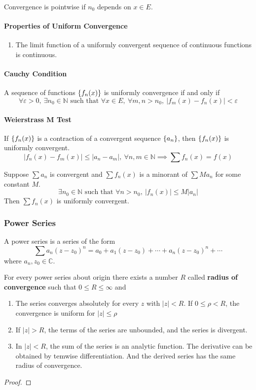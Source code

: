 Convergence is pointwise if $n_0$ depends on $x \in E$.
\paragraph{Properties of Uniform Convergence}
\begin{enumerate}
	\item The limit function of a uniformly convergent sequence of continuous functions is continuous.
\end{enumerate}

\paragraph{Cauchy Condition}
A sequence of functions $\left\{f_n(x)\right\}$ is uniformly convergence if and only if
	\[ \forall \varepsilon > 0, \ \exists n_0 \in \mathbb{N} \text{ such that } \forall x \in E,\ \forall m,n > n_0, \ |f_m(x)-f_n(x)| < \varepsilon \]

\paragraph{Weierstrass M Test}
If $\left\{f_n(x)\right\}$ is a contraction of a convergent sequence $\left\{a_n\right\}$, then $\left\{f_n(x)\right\}$ is uniformly convergent.
\[ |f_n(x)-f_m(x)| \le |a_n - a_m|, \ \forall n,m \in \mathbb{N} \implies \sum f_n(x) = f(x) \]

Suppose $\sum a_n$ is convergent and $\sum f_n(x)$ is a minorant of $\sum Ma_n$ for some constant $M$.
\[ \exists n_0 \in \mathbb{N} \text{ such that } \forall n > n_0,\ |f_n(x)| \le M|a_n| \]
Then $\sum f_n(x) $ is uniformly convergent.

\subsubsection{Power Series}
\begin{definition}
	A power series is a series of the form
	\[ \sum a_n (z-z_0)^n = a_0 + a_1(z-z_0) + \dotsb + a_n(z-z_0)^n + \dotsb \]
	where $a_n,z_0 \in \mathbb{C}$.
\end{definition}

\begin{theorem}
	For every power series about origin there exists a number $R$ called \textbf{radius of convergence} such that $0 \le R \le \infty$ and
	\begin{enumerate}
		\item The series converges absolutely for every $z$ with $|z|<R$.
		If $0 \le \rho < R$, the convergence is uniform for $|z| \le \rho$

		\item If $|z|>R$, the terms of the series are unbounded, and the series is divergent.

		\item In $|z| <R$, the sum of the series is an analytic function. The derivative can be obtained by temwise differentiation.
			And the derived series has the same radius of convergence.
	\end{enumerate}
\end{theorem}
\begin{proof}
\end{proof}

